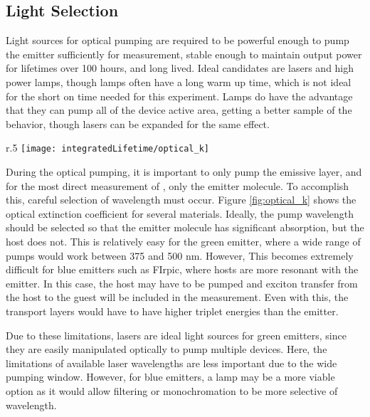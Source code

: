 \documentclass[../thesis.tex]{subfiles}
\begin{document}
\subsection{Light Selection}

Light sources for optical pumping are required to be powerful enough to pump the emitter sufficiently for measurement, stable enough to maintain output power for lifetimes over 100 hours, and long lived.
Ideal candidates are lasers and high power lamps, though lamps often have a long warm up time, which is not ideal for the short on time needed for this experiment.
Lamps do have the advantage that they can pump all of the device active area, getting a better sample of the behavior, though lasers can be expanded for the same effect.

\begin{wrapfigure}{r}{.5\textwidth}
\centering
\texttt{[image: integratedLifetime/optical\_k]}
\caption{Extinction coefficients shown for the green emitter \irppy and blue emitter FIrpic as well as a few host materials.}
\label{fig:optical_k}
\end{wrapfigure}

During the optical pumping, it is important to only pump the emissive layer, and for the most direct measurement of \pl, only the emitter molecule.
To accomplish this, careful selection of wavelength must occur.  
Figure \ref{fig:optical_k} shows the optical extinction coefficient for several materials.  
Ideally, the pump wavelength should be selected so that the emitter molecule has significant absorption, but the host does not.  
This is relatively easy for the green emitter, \irppy where a wide range of pumps would work between 375 and 500 nm.
However, This becomes extremely difficult for blue emitters such as FIrpic, where hosts are more resonant with the emitter.  
In this case, the host may have to be pumped and exciton transfer from the host to the guest will be included in the measurement.
Even with this, the transport layers would have to have higher triplet energies than the emitter.

Due to these limitations, lasers are ideal light sources for green emitters, since they are easily manipulated optically to pump multiple devices.
Here, the limitations of available laser wavelengths are less important due to the wide pumping window.
However, for blue emitters, a lamp may be a more viable option as it would allow filtering or monochromation to be more selective of wavelength.
\end{document}
